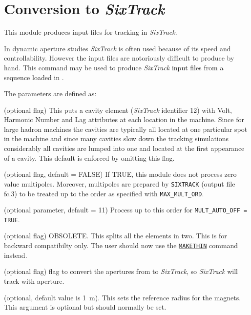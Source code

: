 

\chapter{Conversion to \textit{SixTrack}}
\label{chap:sixtrack}

This module produces input files for tracking in \textit{SixTrack}.

In dynamic aperture studies \textit{SixTrack}\cite{SixTrack} is often
used because of its  speed and controllability. However the input files
are notoriously difficult to produce by hand. This command may be used
to produce \textit{SixTrack} input files from a sequence loaded in \madx.

 
The parameters are defined as: 
\begin{madlist}
    (optional flag) This puts a cavity element
   (\textit{SixTrack} identifier 12) with Volt, Harmonic Number and Lag
   attributes at each location in the machine. Since for large hadron
   machines the cavities are typically all located at one particular
   spot in the machine and since many cavities slow down the tracking
   simulations considerably all cavities are lumped into one and located
   at the first appearance of a cavity. This default is enforced by
   omitting this flag.  

    (optional flag, default = FALSE) If
   TRUE, this module does not process zero value multipoles. 
   Moreover, multipoles are prepared by \texttt{SIXTRACK}
   (output file fc.3) to be treated up to the order as specified with
   {\tt MAX\_MULT\_ORD}.  

    (optional parameter, default = 11) Process up
   to this order for {\tt MULT\_AUTO\_OFF = TRUE}.  

    (optional flag) OBSOLETE. This splits all the
   elements in  two. This is for backward compatibilty only. The user
   should now use the \hyperref[chap:makethin]{\tt MAKETHIN} command
   instead.   

    (optional flag) flag to convert the apertures
   from \madx to \textit{SixTrack}, so \textit{SixTrack} will track
   with aperture.   

    (optional, default value is 1~m). This sets the
   reference  radius for the magnets. This argument is optional but
   should normally be set.  
\end{madlist}

